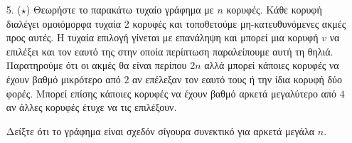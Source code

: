 \documentclass[a4paper, oneside, 11pt]{article}
\theoremstyle{definition}
\begin{document}
\begin{enumerate}
Λήμμα 2: Το ${x \choose 2} + {y\choose 2} + {n-x-y \choose 2}$ ελαχιστοποιείται για $x=y=\frac{n}{3}$.
\begin{proof}
Η παραπάνω παράσταση είναι ίση με $\frac{1}{2} (x^2 + y^2 + (n-x-y)^2 - (x+y+n-x-y)) \geq_{cauchy-schwarz} \frac{1}{2}(\frac{1}{3} n^2 - n)$. Η ισότητα πραγματοποιείται όταν $x=y=n-x-y$, δηλαδή $x=y=\frac{n}{3}$.
\end{proof}

\item[5. ($\star$)]
   Θεωρήστε το παρακάτω τυχαίο γράφημα με $n$ κορυφές. Κάθε κορυφή διαλέγει
   ομοιόμορφα τυχαία 2 κορυφές και τοποθετούμε μη-κατευθυνόμενες ακμές προς
   αυτές. Η τυχαία επιλογή γίνεται με επανάληψη και μπορεί μια κορυφή $v$ να
   επιλέξει και τον εαυτό της στην οποία περίπτωση παραλείπουμε αυτή τη θηλιά.
   Παρατηρούμε ότι οι ακμές θα είναι περίπου $2n$ αλλά μπορεί κάποιες κορυφές να
   έχουν βαθμό μικρότερο από $2$ αν επέλεξαν τον εαυτό τους ή την ίδια κορυφή
   δύο φορές. Μπορεί επίσης κάποιες κορυφές να έχουν βαθμό αρκετά μεγαλύτερο από
   $4$ αν άλλες κορυφές έτυχε να τις επιλέξουν.

   Δείξτε ότι το γράφημα είναι σχεδόν σίγουρα συνεκτικό για αρκετά μεγάλα $n$.


\end{enumerate}
\end{document}
